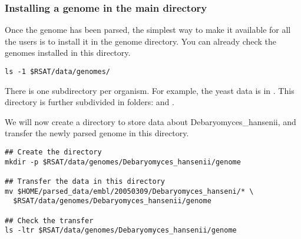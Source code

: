 \subsubsection{Installing a genome in the main \RSAT directory}

Once the genome has been parsed, the simplest way to make it available
 for all the users is to install it in the \RSAT genome directory. You
 can already check the genomes installed in this directory.

\begin{footnotesize}
\begin{verbatim}
ls -1 $RSAT/data/genomes/
\end{verbatim}
\end{footnotesize}

There is one subdirectory per organism. For example, the yeast data is
 in . This
 directory is further subdivided in folders:  and
 .

We will now create a directory to store data about
 Debaryomyces\_hansenii, and transfer the newly parsed genome in this
 directory.

\begin{footnotesize}
\begin{verbatim}
## Create the directory
mkdir -p $RSAT/data/genomes/Debaryomyces_hansenii/genome

## Transfer the data in this directory
mv $HOME/parsed_data/embl/20050309/Debaryomyces_hanseni/* \
  $RSAT/data/genomes/Debaryomyces_hansenii/genome

## Check the transfer
ls -ltr $RSAT/data/genomes/Debaryomyces_hansenii/genome
\end{verbatim}
\end{footnotesize}
